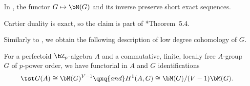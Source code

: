 \blem \label{MG-exact-2}
In \uS{}, the functor $G \mapsto \bM(G)$ and its inverse preserve short exact sequences.
\elem

\bpf
Cartier duality is exact, so the claim is part of \cite{ALB20}*{Theorem~5.4}. %
\epf





Similarly to , we obtain the following description of low degree cohomology of $G$.
%

\bprop \label{Hom-Ext-describe}
For a perfectoid $\bZ_p$-algebra $A$ and a commutative, finite, locally free $A$-group $G$ of $p$-power order, we have  functorial in $A$ and $G$ identifications
\begin{equation} \label{MG-fixed-pts}
\source{purity-flat-cohomology}
\tst   G(A) \cong \bM(G)^{V = 1} \qxq{and} H^1(A, G) \cong \bM(G)/(V - 1)\bM(G).
\end{equation}
\eprop

